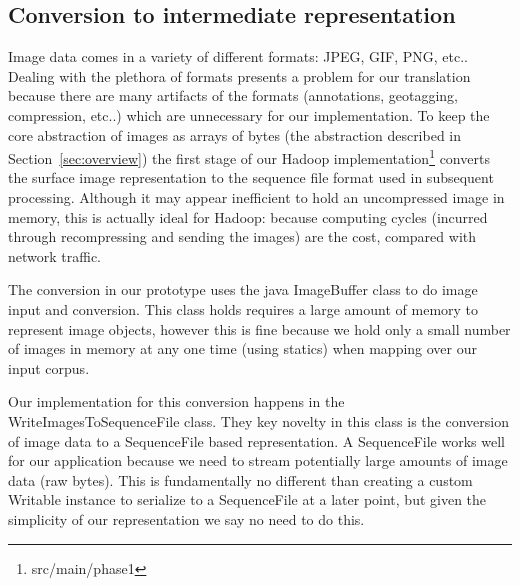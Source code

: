 \documentclass[10pt, conference, compsocconf]{IEEEtran}
\newcommand{\code}[1]{\textsf{\small #1}}
\begin{document}
\subsection{Conversion to intermediate representation}
\label{sec:conversion}

Image data comes in a variety of different formats: JPEG, GIF, PNG,
etc..  Dealing with the plethora of formats presents a problem for our
translation because there are many artifacts of the formats
(annotations, geotagging, compression, etc..) which are unnecessary
for our implementation.  To keep the core abstraction of images as
arrays of bytes (the abstraction described in
Section~\ref{sec:overview}) the first stage of our Hadoop
implementation\footnote{\code{src/main/phase1}} converts the surface
image representation to the sequence file format used in subsequent
processing.  Although it may appear inefficient to hold an
uncompressed image in memory, this is actually ideal for Hadoop:
because computing cycles (incurred through recompressing and sending
the images) are the cost, compared with network traffic.

The conversion in our prototype uses the java \code{ImageBuffer} class
to do image input and conversion.  This class holds requires a large
amount of memory to represent image objects, however this is fine
because we hold only a small number of images in memory at any one
time (using statics) when mapping over our input corpus.

Our implementation for this conversion happens in the
\code{WriteImagesToSequenceFile} class.  They key novelty in this
class is the conversion of image data to a \code{SequenceFile} based
representation.  A \code{SequenceFile} works well for our application
because we need to stream potentially large amounts of image data (raw
bytes).  This is fundamentally no different than creating a custom
Writable instance to serialize to a \code{SequenceFile} at a later
point, but given the simplicity of our representation we say no need
to do this.
\end{document}
